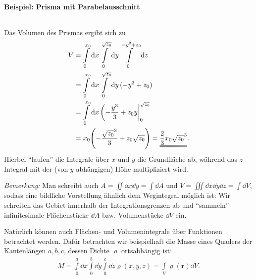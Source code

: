 \newpage
\paragraph{Beispiel: Prisma mit Parabelausschnitt}$~$

\begin{wrapfigure}{r}{6cm}
    \centering
    \vspace{-5mm}
    \vspace{-6cm}
\end{wrapfigure}

Das Volumen des Prismas ergibt sich zu 
\begin{align}
    V &= \int\limits_{0}^{x_0} \dd{x} \int\limits_{0}^{\sqrt{z_0}} \dd{y} \int\limits_{0}^{-y^2 + z_0} \dd{z} \notag \\
    &= \int\limits_{0}^{x_0} \dd{x} \int\limits_{0}^{\sqrt{z_0}} \dd{y} ( -y^2 + z_0) \notag \\
    &= \int\limits_{0}^{x_0} \dd{x} \eval(-\frac{y^3}{3}+z_0 y|_0^{\sqrt{z_0}} \notag \\
    &= x_0 \qty(-\frac{\sqrt{z_0}^3}{3} + z_0 \sqrt{z_0}) = \uuline{\frac{2}{3} x_0 \sqrt{z_0}^3}.
\end{align}
Hierbei ``laufen'' die Integrale über $x$ und $y$ die Grundfläche ab, während das $z$-Integral mit der (von $y$ abhängigen) Höhe multipliziert wird. 

\emph{Bemerkung: } Man schreibt auch $A = \iint \dd{x}\dd{y} = \int \dd{A}$ und $V = \iiint \dd{x}\dd{y}\dd{z} = \int \dd{V}$, sodass eine bildliche Vorstellung ähnlich dem Wegintegral möglich ist: Wir schreiten das Gebiet innerhalb der Integrationsgrenzen ab und ``sammeln'' infinitesimale Flächenstücke $\dd{A}$ bzw. Volumenstücke $\dd{V}$ ein.

Natürlich können auch Flächen- und Volumenintegrale über Funktionen betrachtet werden. Dafür betrachten wir beispielhaft die Masse eines Quaders der Kantenlängen $a,b,c$, dessen Dichte $\varrho$ ortsabhängig ist: 
\begin{align}
    M = \int\limits_{0}^{a}\dd{x} \int\limits_{0}^{b}\dd{y} \int\limits_{0}^{c}\dd{z} \varrho(x,y,z) = \int\limits_{V} \varrho(\bm{r}) \dd{V}.
\end{align}

